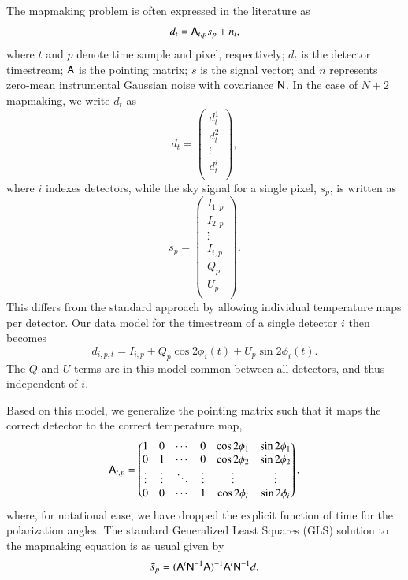 \documentclass{aa}
\newcommand{\A}[0]{\tens{A}}
\newcommand{\N}[0]{\tens{N}}
\begin{document}
The mapmaking problem is often expressed in the literature as \citep[e.g.,][]{de_Gasperis_2005}
\begin{equation}
d_t = \A_{t,p}s_p + n_t,
\end{equation}
where $t$ and $p$ denote time sample and pixel, respectively; $d_t$ is the detector timestream; $\A$ is the pointing matrix; $s$ is the signal vector; and $n$ represents zero-mean instrumental Gaussian noise with covariance $\N$. In the case of $N+2$ mapmaking, we write $d_t$ as 
\begin{equation}
d_t = \begin{pmatrix}
d_t^1\\ d_t^2\\ \vdots \\ d_t^i\\
\end{pmatrix},
\end{equation}
where $i$ indexes detectors, while the sky signal for a single pixel, $s_p$, is written as
\begin{equation}
s_p = \begin{pmatrix}
I_{1,p}\\
I_{2,p}\\
\vdots\\
I_{i,p}\\
Q_p\\
U_p\\
\end{pmatrix}.
\end{equation}
This differs from the standard approach by allowing individual temperature maps per detector. Our data model for the timestream of a single detector $i$ then becomes
\begin{equation}
d_{i,p,t} = I_{i,p} + Q_p \cos2\phi_i(t) + U_p \sin2\phi_i(t).
\label{eq:datamodel}
\end{equation}
The $Q$ and $U$ terms are in this model common between all detectors, and thus independent of $i$.

Based on this model, we generalize the pointing matrix such that it maps the correct detector to the correct temperature map,
\begin{equation}
\A_{t,p} = \begin{pmatrix}
1 & 0 & \cdots & 0 & \cos2\phi_1 & \sin2\phi_1 \\
0 & 1 & \cdots & 0 & \cos2\phi_2 & \sin2\phi_2 \\
\vdots & \vdots & \ddots & \vdots & \vdots & \vdots \\
0 & 0 & \cdots & 1 & \cos2\phi_i & \sin2\phi_i \\
\end{pmatrix},
\end{equation}
where, for notational ease, we have dropped the explicit function of time for the polarization angles. The standard Generalized Least Squares (GLS) solution to the mapmaking equation is as usual given by
\begin{equation}
\tilde{s}_p = (\A^t \N^{-1}\A)^{-1} \A^t\N^{-1}d.
\label{eq:gls}
\end{equation}
\end{document}
